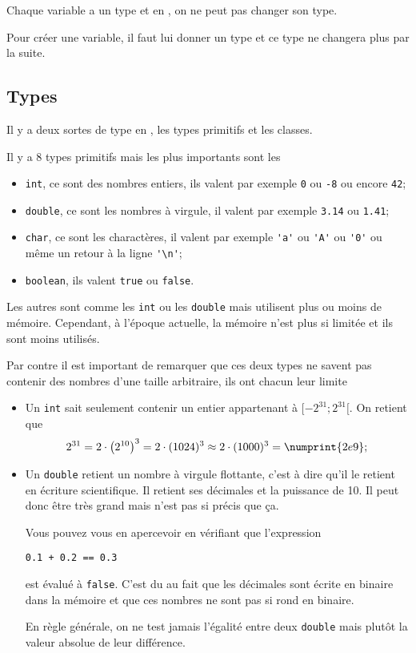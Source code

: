 Chaque variable a un type et en \java{}, on ne peut pas changer son type.

Pour créer une variable, il faut lui donner un type et ce type ne changera
plus par la suite.
\subsection{Types}
Il y a deux sortes de type en \java{}, les types primitifs et les classes.

Il y a 8 types primitifs mais les plus importants sont les
\begin{itemize}
  \item \lstinline|int|, ce sont des nombres entiers, ils valent par exemple
    \lstinline|0| ou \lstinline|-8| ou encore \lstinline|42|;
  \item \lstinline|double|, ce sont les nombres à virgule, il valent par exemple
    \lstinline|3.14| ou \lstinline|1.41|;
  \item \lstinline|char|, ce sont les charactères,
    il valent par exemple \lstinline|'a'|
    ou \lstinline|'A'| ou \lstinline|'0'| ou
    même un retour à la ligne \lstinline|'\n'|;
  \item \lstinline|boolean|, ils valent \lstinline|true| ou \lstinline|false|.
\end{itemize}
Les autres sont comme les \lstinline|int| ou les \lstinline|double|
mais utilisent plus
ou moins de mémoire. Cependant, à l'époque actuelle, la mémoire n'est plus
si limitée et ils sont moins utilisés.

Par contre il est important de remarquer que ces deux types ne savent
pas contenir des nombres d'une taille arbitraire, ils ont chacun leur limite
\begin{itemize}
  \item Un \lstinline|int| sait seulement contenir un entier appartenant à
    $[-2^{31}; 2^{31}[$. On retient que
    \[ 2^{31} = 2 \cdot \left(2^{10}\right)^3 = 2 \cdot (1024)^3
    \approx 2 \cdot (1000)^3 = \numprint{2e9}; \]
  \item Un \lstinline|double| retient un nombre à virgule flottante,
    c'est à dire
    qu'il le retient en écriture scientifique.
    Il retient ses décimales et la puissance de 10.
    Il peut donc être très grand mais n'est pas si précis que ça.

    Vous pouvez vous en apercevoir en vérifiant que l'expression
    \begin{lstlisting}
0.1 + 0.2 == 0.3
    \end{lstlisting}
    est évalué à \lstinline|false|.
    C'est du au fait que les décimales sont écrite en binaire dans la mémoire
    et que ces nombres ne sont pas si rond en binaire.

    En règle générale, on ne test jamais l'égalité entre deux \lstinline|double|
    mais plutôt la valeur absolue de leur différence.
\end{itemize}

